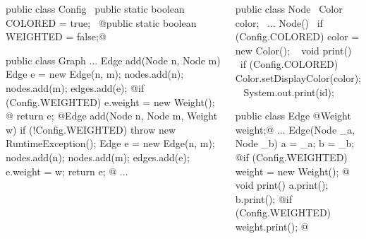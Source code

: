\begin{frame}[fragile]{\myframetitle}
		\begin{columns}
\begin{tiny}
\begin{codetight}{}
public class Config {
	~public static boolean COLORED = true;~
	@public static boolean WEIGHTED = false;@
}
\end{codetight}
\begin{codetight}{}
public class Graph {
	...
	Edge add(Node n, Node m) {
		Edge e = new Edge(n, m);
		nodes.add(n); nodes.add(m); edges.add(e);
		@if (Config.WEIGHTED) { e.weight = new Weight(); }@
		return e;
	}
	@Edge add(Node n, Node m, Weight w) {
		if (!Config.WEIGHTED) { throw new RuntimeException(); }
		Edge e = new Edge(n, m);
		nodes.add(n); nodes.add(m); edges.add(e);
		e.weight = w;
		return e;
	}@
	...
}
\end{codetight}
\end{tiny}	
\begin{tiny}
\begin{codetight}{}
public class Node {
	~Color color;~
	...
	Node(){
		~if (Config.COLORED) { color = new Color(); }~
	}
	void print() {
		~if (Config.COLORED) { Color.setDisplayColor(color); }~
		System.out.print(id);
	}
}
\end{codetight}
\begin{codetight}{}
public class Edge {
	@Weight weight;@
	...
	Edge(Node _a, Node _b) {
		a = _a; b = _b;
		@if (Config.WEIGHTED) { weight = new Weight(); }@
	}
	void print() {
		a.print(); b.print();
		@if (Config.WEIGHTED) { weight.print(); }@
	}
}
\end{codetight}
\end{tiny}	
		\end{columns}
\end{frame}

